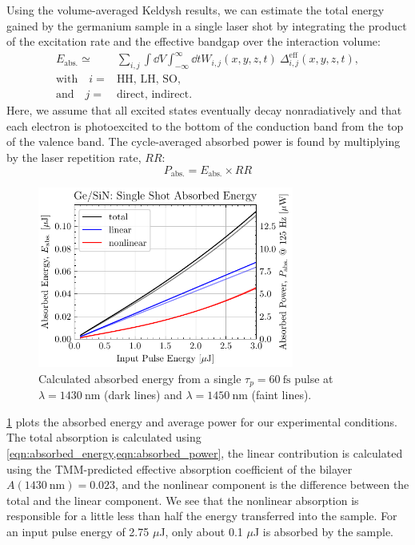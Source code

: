 Using the volume-averaged Keldysh results, we can estimate the total energy gained by the germanium sample in a single laser shot by integrating the product of the excitation rate and the effective bandgap over the interaction volume:
\begin{equation}
\begin{split}
E_{\textrm{abs.}} \simeq {}& \sum_{i,j} \int \dd{V} \int_{-\infty}^{\infty} \dd{t} W_{i,j} (x, y, z, t) \ \Delta_{i,j}^{\textrm{eff}}(x,y,z,t), \\
\textrm{with} \quad i={}&\textrm{HH, LH, SO}, \\
\textrm{and} \quad j={}&\textrm{direct, indirect.}
\end{split}
\label{eqn:absorbed_energy}
\end{equation}
Here, we assume that all excited states eventually decay nonradiatively and that each electron is photoexcited to the bottom of the conduction band from the top of the valence band. The cycle-averaged absorbed power is found by multiplying by the laser repetition rate, $RR$:
\begin{equation}
P_{\textrm{abs.}} = E_{\textrm{abs.}} \times RR
\label{eqn:absorbed_power}
\end{equation}

\begin{figure}
	\centering
	\includegraphics[width=0.75\textwidth]{figures/chap4/Single_shot_abs_ener.pdf}
	\caption{Calculated absorbed energy from a single $\tau_p = 60 \ \textrm{fs}$ pulse at $\lambda=1430 \ \textrm{nm}$ (dark lines) and $\lambda = 1450 \ \textrm{nm}$ (faint lines).}
	\label{fig:Single_shot_abs_ener}
\end{figure}

\cref{fig:Single_shot_abs_ener} plots the absorbed energy and average power for our experimental conditions. The total absorption is calculated using \cref{eqn:absorbed_energy,eqn:absorbed_power}, the linear contribution is calculated using the TMM-predicted effective absorption coefficient of the bilayer $A (1430 \ \textrm{nm}) = 0.023$, and the nonlinear component is the difference between the total and the linear component. We see that the nonlinear absorption is responsible for a little less than half the energy transferred into the sample. For an input pulse energy of 2.75 $\mu$J, only about 0.1 $\mu$J is absorbed by the sample.

